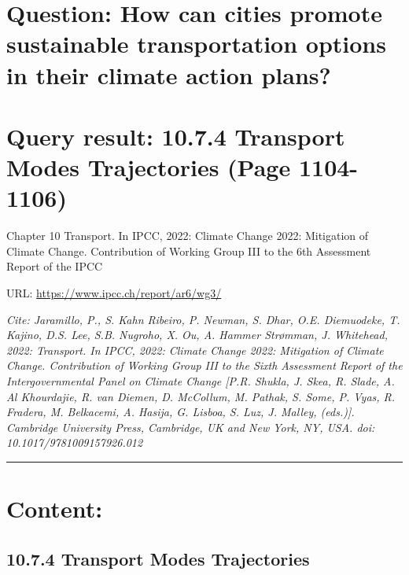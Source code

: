 \documentclass[
  letterpaper,
  DIV=11,
  numbers=noendperiod]{scrreprt}
\begin{document}
\hypertarget{question-how-can-cities-promote-sustainable-transportation-options-in-their-climate-action-plans}{%
\section{Question: How can cities promote sustainable transportation
options in their climate action
plans?}\label{question-how-can-cities-promote-sustainable-transportation-options-in-their-climate-action-plans}}

\hypertarget{query-result-10.7.4-transport-modes-trajectories-page-1104-1106}{%
\section{Query result: 10.7.4 Transport Modes Trajectories (Page
1104-1106)}\label{query-result-10.7.4-transport-modes-trajectories-page-1104-1106}}

Chapter 10 Transport. In IPCC, 2022: Climate Change 2022: Mitigation of
Climate Change. Contribution of Working Group III to the 6th Assessment
Report of the IPCC

URL: \url{https://www.ipcc.ch/report/ar6/wg3/}

\emph{Cite: Jaramillo, P., S. Kahn Ribeiro, P. Newman, S. Dhar, O.E.
Diemuodeke, T. Kajino, D.S. Lee, S.B. Nugroho, X. Ou, A. Hammer
Strømman, J. Whitehead, 2022: Transport. In IPCC, 2022: Climate Change
2022: Mitigation of Climate Change. Contribution of Working Group III to
the Sixth Assessment Report of the Intergovernmental Panel on Climate
Change {[}P.R. Shukla, J. Skea, R. Slade, A. Al Khourdajie, R. van
Diemen, D. McCollum, M. Pathak, S. Some, P. Vyas, R. Fradera, M.
Belkacemi, A. Hasija, G. Lisboa, S. Luz, J. Malley, (eds.){]}. Cambridge
University Press, Cambridge, UK and New York, NY, USA. doi:
10.1017/9781009157926.012}

\begin{center}\rule{0.5\linewidth}{0.5pt}\end{center}

\hypertarget{content-2}{%
\section{Content:}\label{content-2}}

\hypertarget{transport-modes-trajectories}{%
\subsection{10.7.4 Transport Modes
Trajectories}\label{transport-modes-trajectories}}
\end{document}
